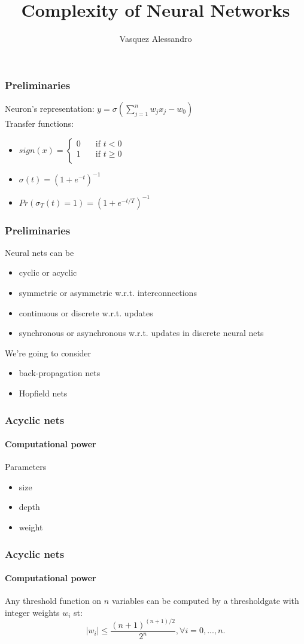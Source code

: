 \documentclass{beamer}
\title{Complexity of Neural Networks}
\author{Vasquez Alessandro}
\institute{Université Nice-Sophia-Antipolis}
\begin{document}
\frame{\titlepage}

\begin{frame}
\frametitle{Preliminaries}
Neuron's representation:
$y = \sigma (\sum_{j=1}^{n}w_jx_j - w_0)$ \\
Transfer functions: 
\begin{itemize}
	\item $   
	sign(x)  = 
	\begin{cases}
	0 &\quad\text{if } t < 0\\
	1 &\quad\text{if } t \geq 0 \\
	\end{cases}
	$
	\item $\sigma (t) = (1+e^{-t})^{-1}$
	\item $Pr(\sigma_T(t) = 1 ) = (1+e^{-t/T})^{-1} $
\end{itemize}

\end{frame}


\begin{frame}
\frametitle{Preliminaries}
Neural nets can be
\begin{itemize}
	\item cyclic or acyclic
	\item symmetric or asymmetric w.r.t. interconnections
	\item continuous or discrete w.r.t. updates
	\item synchronous or asynchronous w.r.t. updates in discrete neural nets
\end{itemize}
We're going to consider
\begin{itemize}
	\item back-propagation nets
	\item Hopfield nets
\end{itemize}
\end{frame}


\begin{frame}
\frametitle{Acyclic nets}
\framesubtitle{Computational power}
Parameters
\begin{itemize}
	\item size
	\item depth
	\item weight
\end{itemize}
\end{frame}

\begin{frame}
\frametitle{Acyclic nets}
\framesubtitle{Computational power}	
	\begin{theorem}
		Any threshold function on $n$ variables can be computed by a thresholdgate with integer weights $w_i$ st: $$|w_i| \leq \frac{(n+1)^{(n+1)/2}}{2^n}, \forall i =0,...,n.$$
	\end{theorem}
\end{frame}
\end{document}
